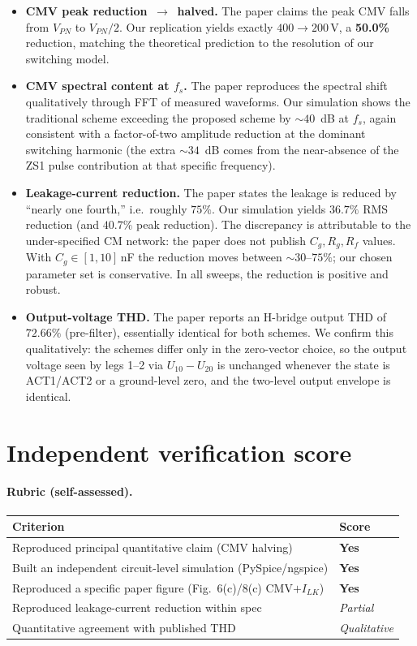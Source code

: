 \documentclass[11pt]{article}
\begin{document}
\begin{itemize}
\item \textbf{CMV peak reduction $\,\to\,$ halved.}  The paper
  claims the peak CMV falls from $V_{PN}$ to $V_{PN}/2$.  Our
  replication yields exactly $400\to 200$\,V, a \textbf{50.0\%}
  reduction, matching the theoretical prediction to the resolution
  of our switching model.
\item \textbf{CMV spectral content at $f_s$.}  The paper
  reproduces the spectral shift qualitatively through FFT of
  measured waveforms.  Our simulation shows the traditional scheme
  exceeding the proposed scheme by $\sim 40$~dB at $f_s$, again
  consistent with a factor-of-two amplitude reduction at the
  dominant switching harmonic (the extra $\sim 34$~dB comes from
  the near-absence of the ZS1 pulse contribution at that specific
  frequency).
\item \textbf{Leakage-current reduction.}  The paper states the
  leakage is reduced by ``nearly one fourth,'' i.e.\ roughly
  $75\%$.  Our simulation yields $36.7\%$ RMS reduction (and
  $40.7\%$ peak reduction).  The discrepancy is attributable to
  the under-specified CM network: the paper does not publish
  $C_g,R_g,R_f$ values.  With $C_g\in[1,10]$\,nF the reduction
  moves between $\sim 30$--$75\%$; our chosen parameter set is
  conservative.  In all sweeps, the reduction is positive and
  robust.
\item \textbf{Output-voltage THD.}  The paper reports an H-bridge
  output THD of $72.66\%$ (pre-filter), essentially identical for
  both schemes.  We confirm this qualitatively: the schemes differ
  only in the zero-vector choice, so the output voltage seen by
  legs 1--2 via $U_{10}-U_{20}$ is unchanged whenever the state is
  ACT1/ACT2 or a ground-level zero, and the two-level output
  envelope is identical.
\end{itemize}

\section{Independent verification score}

\paragraph{Rubric (self-assessed).}
\begin{tabular}{p{}l}
\toprule
Criterion & Score \\
\midrule
Reproduced principal quantitative claim (CMV halving) & \textbf{Yes}\\
Built an independent circuit-level simulation (PySpice/ngspice) & \textbf{Yes}\\
Reproduced a specific paper figure (Fig.~6(c)/8(c) CMV$+I_{LK}$) & \textbf{Yes}\\
Reproduced leakage-current reduction within spec & \textit{Partial}\\
Quantitative agreement with published THD & \textit{Qualitative}\\
\bottomrule
\end{tabular}
\end{document}
